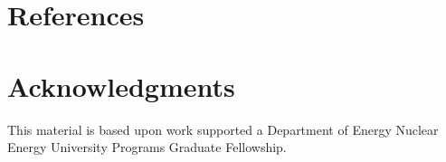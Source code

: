\documentclass[review]{elsarticle}
\begin{document}
\section*{References}

\section*{Acknowledgments}
This material is based upon work supported a Department of Energy Nuclear
Energy University Programs Graduate Fellowship.



\end{document}
